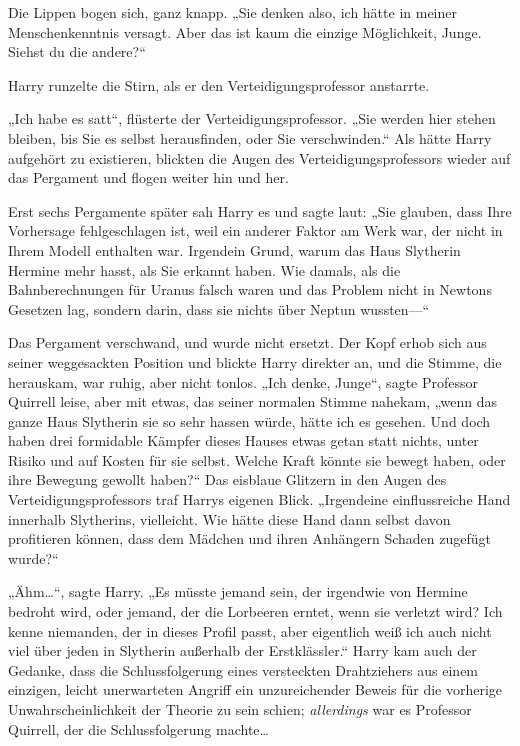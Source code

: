 {Die Lippen bogen sich, ganz knapp. „Sie denken also, ich hätte in meiner Menschenkenntnis versagt. Aber das ist kaum die einzige Möglichkeit, Junge. Siehst du die andere?“

Harry runzelte die Stirn, als er den Verteidigungsprofessor anstarrte.

„Ich habe es satt“, flüsterte der Verteidigungsprofessor. „Sie werden hier stehen bleiben, bis Sie es selbst herausfinden, oder Sie verschwinden.“ Als hätte Harry aufgehört zu existieren, blickten die Augen des Verteidigungsprofessors wieder auf das Pergament und flogen weiter hin und her.

Erst sechs Pergamente später sah Harry es und sagte laut: „Sie glauben, dass Ihre Vorhersage fehlgeschlagen ist, weil ein anderer Faktor am Werk war, der nicht in Ihrem Modell enthalten war. Irgendein Grund, warum das Haus Slytherin Hermine mehr hasst, als Sie erkannt haben. Wie damals, als die Bahnberechnungen für Uranus falsch waren und das Problem nicht in Newtons Gesetzen lag, sondern darin, dass sie nichts über Neptun wussten—“

Das Pergament verschwand, und wurde nicht ersetzt. Der Kopf erhob sich aus seiner weggesackten Position und blickte Harry direkter an, und die Stimme, die herauskam, war ruhig, aber nicht tonlos. „Ich denke, Junge“, sagte Professor Quirrell leise, aber mit etwas, das seiner normalen Stimme nahekam, „wenn das ganze Haus Slytherin sie so sehr hassen würde, hätte ich es gesehen. Und doch haben drei formidable Kämpfer dieses Hauses etwas getan statt nichts, unter Risiko und auf Kosten für sie selbst. Welche Kraft könnte sie bewegt haben, oder ihre Bewegung gewollt haben?“ Das eisblaue Glitzern in den Augen des Verteidigungsprofessors traf Harrys eigenen Blick. „Irgendeine einflussreiche Hand innerhalb Slytherins, vielleicht. Wie hätte diese Hand dann selbst davon profitieren können, dass dem Mädchen und ihren Anhängern Schaden zugefügt wurde?“

„Ähm…“, sagte Harry. „Es müsste jemand sein, der irgendwie von Hermine bedroht wird, oder jemand, der die Lorbeeren erntet, wenn sie verletzt wird? Ich kenne niemanden, der in dieses Profil passt, aber eigentlich weiß ich auch nicht viel über jeden in Slytherin außerhalb der Erstklässler.“ Harry kam auch der Gedanke, dass die Schlussfolgerung eines versteckten Drahtziehers aus einem einzigen, leicht unerwarteten Angriff ein unzureichender Beweis für die vorherige Unwahrscheinlichkeit der Theorie zu sein schien; \emph{allerdings} war es Professor Quirrell, der die Schlussfolgerung machte…

}
